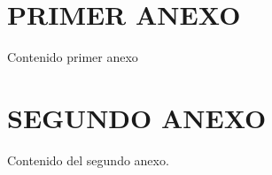 
\chapter{PRIMER ANEXO}
\label{ch:capituloAA}

Contenido primer anexo


\chapter{SEGUNDO ANEXO}
\label{ch:capituloAB}


Contenido del segundo anexo.


